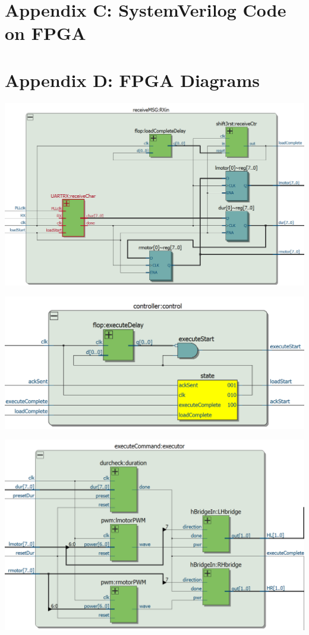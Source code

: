 \documentclass[11pt]{article}
\begin{document}
\section{Appendix C: SystemVerilog Code on FPGA}


\section{Appendix D: FPGA Diagrams}

\begin{center}
\includegraphics[width=\textwidth]{receiveMSG}
\end{center}

\begin{center}
\includegraphics[width=\textwidth]{controller}
\end{center}

\begin{center}
\includegraphics[width=\textwidth]{executeCommand}
\end{center}
\end{document}
